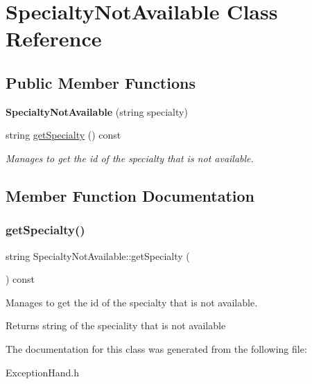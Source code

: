 \hypertarget{class_specialty_not_available}{}\section{Specialty\+Not\+Available Class Reference}
\label{class_specialty_not_available}
\subsection*{Public Member Functions}
\begin{DoxyCompactItemize}
\item 
\mbox{\label{class_specialty_not_available_a1f5f874d6227ffd1083d2f07657ca8f6}} 
{\bfseries Specialty\+Not\+Available} (string specialty)
\item 
string \hyperlink{class_specialty_not_available_aeb467ae8d75b1bc7b937fd1683deff6e}{get\+Specialty} () const
\begin{DoxyCompactList}\small\item\em Manages to get the id of the specialty that is not available. \end{DoxyCompactList}\end{DoxyCompactItemize}


\subsection{Member Function Documentation}
\mbox{\label{class_specialty_not_available_aeb467ae8d75b1bc7b937fd1683deff6e}} 
\subsubsection{\texorpdfstring{get\+Specialty()}{getSpecialty()}}
{\footnotesize\ttfamily string Specialty\+Not\+Available\+::get\+Specialty (\begin{DoxyParamCaption}{ }\end{DoxyParamCaption}) const\hspace{0.3cm}{\ttfamily [inline]}}



Manages to get the id of the specialty that is not available. 

\begin{DoxyReturn}{Returns}
string of the speciality that is not available 
\end{DoxyReturn}


The documentation for this class was generated from the following file\+:\begin{DoxyCompactItemize}
\item 
Exception\+Hand.\+h\end{DoxyCompactItemize}
